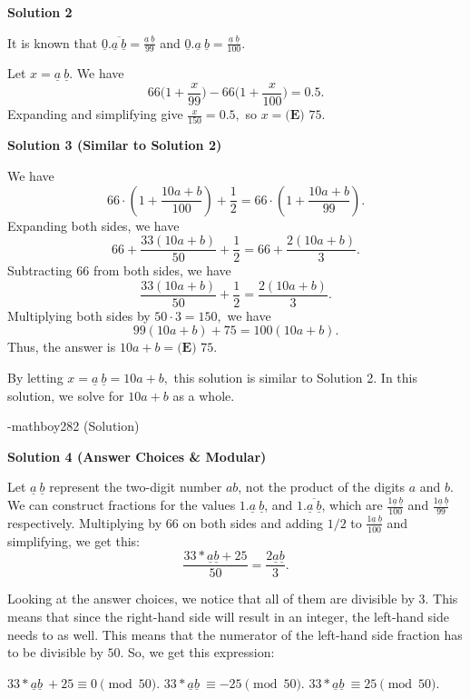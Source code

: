 \begin{enumerate}
\textbf{Solution 2}

It is known that $\underline{0}.\overline{\underline{a} \ \underline{b}}=\frac{\underline{a} \ \underline{b}}{99}$ and $\underline{0}.\underline{a} \ \underline{b}=\frac{\underline{a} \ \underline{b}}{100}.$ 

 Let $x=\underline{a} \ \underline{b}.$ We have 
 \[66\biggl(1+\frac{x}{99}\biggr)-66\biggl(1+\frac{x}{100}\biggr)=0.5.\] Expanding and simplifying give $\frac{x}{150}=0.5,$ so $x=\boxed{\textbf{(E) }75}.$




\textbf{Solution 3 (Similar to Solution 2)}

We have 
 \[66 \cdot \left(1 + \frac{10a+b}{100}\right) + \frac{1}{2} = 66 \cdot \left(1+ \frac{10a+b}{99}\right).\]Expanding both sides, we have 
 \[66 + \frac{33(10a+b)}{50} + \frac{1}{2} = 66 + \frac{2(10a+b)}{3}.\]Subtracting $66$ from both sides, we have 
 \[\frac{33(10a+b)}{50} + \frac{1}{2} = \frac{2(10a+b)}{3}.\]Multiplying both sides by $50 \cdot 3 = 150,$ we have 
 \[99(10a+b) + 75 = 100(10a+b).\]Thus, the answer is $10a+b = \boxed{\textbf{(E) }75}.$

 By letting $x=\underline{a} \ \underline{b}=10a+b,$ this solution is similar to Solution 2. In this solution, we solve for $10a+b$ as a whole.

 -mathboy282 (Solution)

 



\textbf{Solution 4 (Answer Choices \& Modular)}

Let $\underline{a} \ \underline{b}$ represent the two-digit number $ab$, not the product of the digits $a$ and $b$. We can construct fractions for the values $1.\underline{a} \ \underline{b}$, and $1.\overline{\underline{a} \ \underline{b}}$, which are $\frac{1\underline{a} \ \underline{b}}{100}$ and $\frac{1\underline{a} \ \underline{b}}{99}$  respectively. Multiplying by $66$ on both sides and adding $1/2$ to $\frac{1\underline{a} \ \underline{b}}{100}$ and simplifying, we get this: 
 \[\frac{33 * \underline{a}\underline{b} + 25}{50} = \frac{2\underline{a}\underline{b}}{3}.\]

 Looking at the answer choices, we notice that all of them are divisible by $3$. This means that since the right-hand side will result in an integer, the left-hand side needs to as well. This means that the numerator of the left-hand side fraction has to be divisible by $50$. So, we get this expression:

 $33 * \underline{a}\underline{b}\ + 25 \equiv 0\pmod{50}.$
$33 * \underline{a}\underline{b}\ \equiv -25\pmod{50}.$
$33 * \underline{a}\underline{b}\ \equiv 25\pmod{50}.$


\end{enumerate}
